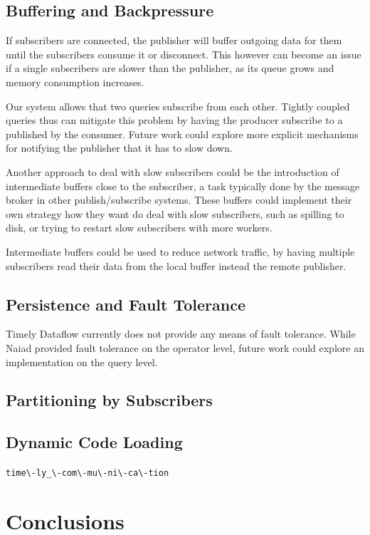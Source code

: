 \subsection{Buffering and Backpressure}

If subscribers are connected, the publisher will buffer outgoing data for them
until the subscribers consume it or disconnect. This however can become an issue
if a single subscribers are slower than the publisher, as its queue grows and
memory consumption increases.

Our system allows that two queries subscribe from each other. Tightly coupled
queries thus can mitigate this problem by having the producer subscribe to
a  published by the consumer. Future work could
explore more explicit mechanisms for notifying the publisher that it has to
slow down.

Another approach to deal with slow subscribers could be the introduction of
intermediate buffers close to the subscriber, a task typically done by the
message broker in other publish/subscribe systems. These buffers could
implement their own strategy how they want do deal with slow subscribers,
such as spilling to disk, or trying to restart slow subscribers with more
workers.

Intermediate buffers could be used to reduce network traffic, by having
multiple subscribers read their data from the local buffer instead the remote
publisher.

\subsection{Persistence and Fault Tolerance}

Timely Dataflow currently does not provide any means of fault tolerance. While
Naiad \cite{naiad} provided fault tolerance on the operator level, future work
could explore an implementation on the query level.

\subsection{Partitioning by Subscribers}



\subsection{Dynamic Code Loading}



\lstinline{time\-ly_\-com\-mu\-ni\-ca\-tion}

\clearpage
\section{Conclusions}
